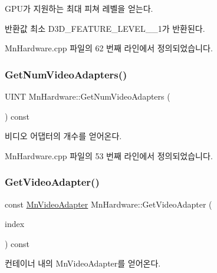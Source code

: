 G\+P\+U가 지원하는 최대 피쳐 레벨을 얻는다. 

\begin{DoxyReturn}{반환값}
최소 D3\+D\+\_\+\+F\+E\+A\+T\+U\+R\+E\+\_\+\+L\+E\+V\+E\+L\+\_\+\_\+1가 반환된다. 
\end{DoxyReturn}


Mn\+Hardware.\+cpp 파일의 62 번째 라인에서 정의되었습니다.

\mbox{\label{class_m_n_l_1_1_mn_hardware_a4b614d4e29b4bd48f0d952f3ec707d12}} 
\subsubsection{\texorpdfstring{Get\+Num\+Video\+Adapters()}{GetNumVideoAdapters()}}
{\footnotesize\ttfamily U\+I\+NT Mn\+Hardware\+::\+Get\+Num\+Video\+Adapters (\begin{DoxyParamCaption}{ }\end{DoxyParamCaption}) const}



비디오 어댑터의 개수를 얻어온다. 



Mn\+Hardware.\+cpp 파일의 53 번째 라인에서 정의되었습니다.

\mbox{\label{class_m_n_l_1_1_mn_hardware_a84b1095acf9196e1bb0fe6a1f996b697}} 
\subsubsection{\texorpdfstring{Get\+Video\+Adapter()}{GetVideoAdapter()}}
{\footnotesize\ttfamily const \hyperlink{class_m_n_l_1_1_mn_video_adapter}{Mn\+Video\+Adapter} Mn\+Hardware\+::\+Get\+Video\+Adapter (\begin{DoxyParamCaption}\item[{U\+I\+NT}]{index }\end{DoxyParamCaption}) const}



컨테이너 내의 Mn\+Video\+Adapter를 얻어온다. 


